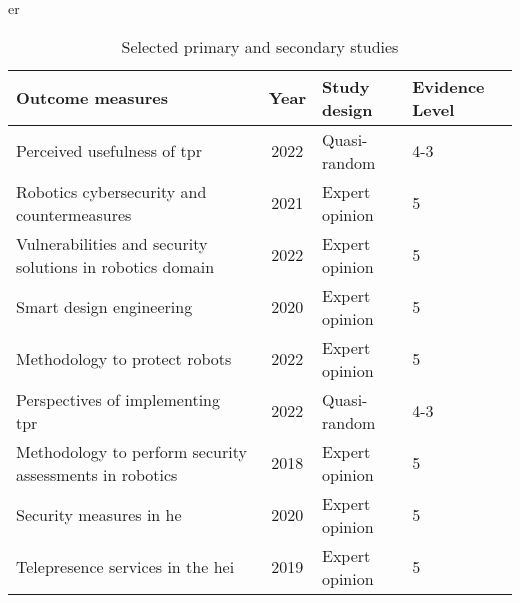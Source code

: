 \begin{table}[h!]
\centering
er
\caption{Selected primary and secondary studies}
\label{tab:studies}
\begin{tabularx}{\columnwidth}{lcll}
\toprule
\textbf{Outcome measures}                                                                       & \textbf{Year} & \textbf{Study design} & \textbf{Evidence Level} \\
\midrule
Perceived usefulness of \ac{tpr}~\cite[]{acceptance-telepresence-robots-2022}                  & 2022          & Quasi-random          & 4-3                     \\
Robotics cybersecurity and countermeasures~\cite[]{cyber_security_issues_in_robotics_2021}                                     & 2021          & Expert opinion        & 5                       \\
Vulnerabilities and security solutions in robotics domain~\cite[]{robotics_cyber_security_2022}                                  & 2022& Expert opinion& 5                       \\
Smart design engineering~\cite[]{smart_design_engineering_2020}                                 & 2020          & Expert opinion& 5                       \\
Methodology to protect robots~\cite[]{robot_security_review_2022}                               & 2022          & Expert opinion& 5                       \\
Perspectives of implementing \ac{tpr}~\cite[]{higher_edu_perception_on_tprs_2022}                                                         & 2022          & Quasi-random          & 4-3                     \\
Methodology to perform security assessments in robotics~\cite[]{robot_security_framework_2018}                                         & 2018          & Expert opinion& 5                       \\
Security measures in \ac{he}~\cite[]{role_of_cyber_security_in_higher_edu_2020}                 & 2020          & Expert opinion& 5                       \\
Telepresence services in the \ac{hei}~\cite[]{telepresence_robots_in_classroom_2019}                                                           & 2019          & Expert opinion& 5                       \\
\bottomrule
\end{tabularx}
\end{table}



